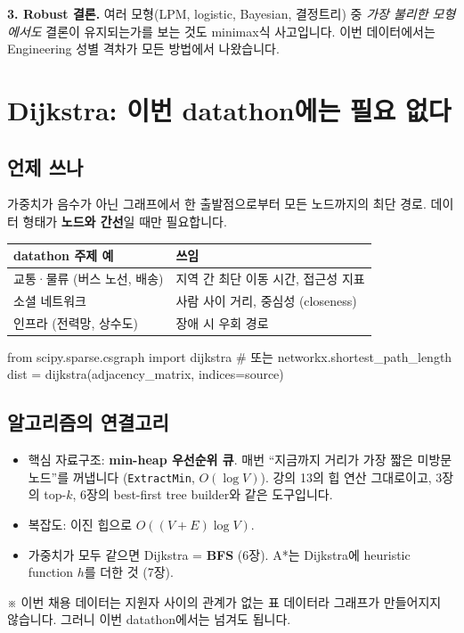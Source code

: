 \documentclass[11pt,a4paper]{article}
\newcommand{\code}[1]{\texttt{#1}}
\newcommand{\aside}[1]{{\footnotesize\color{black!65}#1}}
\begin{document}
\textbf{3. Robust 결론.} 여러 모형(LPM, logistic, Bayesian, 결정트리) 중 \emph{가장 불리한 모형에서도} 결론이 유지되는가를 보는 것도 minimax식 사고입니다. 이번 데이터에서는 Engineering 성별 격차가 모든 방법에서 나왔습니다.

\section{Dijkstra: 이번 datathon에는 필요 없다}

\subsection{언제 쓰나}
가중치가 음수가 아닌 그래프에서 한 출발점으로부터 모든 노드까지의 최단 경로. 데이터 형태가 \textbf{노드와 간선}일 때만 필요합니다.
\begin{center}
\begin{tabular}{@{}l l@{}}
\toprule
datathon 주제 예 & 쓰임 \\
\midrule
교통·물류 (버스 노선, 배송) & 지역 간 최단 이동 시간, 접근성 지표 \\
소셜 네트워크 & 사람 사이 거리, 중심성 (closeness) \\
인프라 (전력망, 상수도) & 장애 시 우회 경로 \\
\bottomrule
\end{tabular}
\end{center}
\begin{codebox}
from scipy.sparse.csgraph import dijkstra \hfill \# 또는 networkx.shortest\_path\_length\\
dist = dijkstra(adjacency\_matrix, indices=source)
\end{codebox}

\subsection{알고리즘의 연결고리}
\begin{itemize}
\item 핵심 자료구조: \textbf{min-heap 우선순위 큐}. 매번 ``지금까지 거리가 가장 짧은 미방문 노드''를 꺼냅니다 (\code{ExtractMin}, $O(\log V)$). 강의 13의 힙 연산 그대로이고, 3장의 top-$k$, 6장의 best-first tree builder와 같은 도구입니다.
\item 복잡도: 이진 힙으로 $O((V+E)\log V)$.
\item 가중치가 모두 같으면 Dijkstra = \textbf{BFS} (6장). A*는 Dijkstra에 heuristic function $h$를 더한 것 (7장).
\end{itemize}
\aside{※ 이번 채용 데이터는 지원자 사이의 관계가 없는 표 데이터라 그래프가 만들어지지 않습니다. 그러니 이번 datathon에서는 넘겨도 됩니다.}
\end{document}
